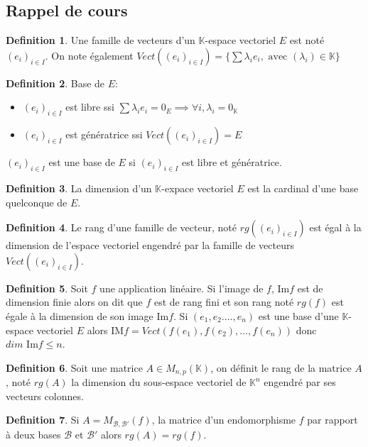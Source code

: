 \documentclass[]{book}
\theoremstyle{definition}
\newtheorem{defn}{Definition}
\newcommand{\bb}[1]{\mathbb{#1}}
\newcommand{\K}{\bb{K}}
\begin{document}
\subsection*{Rappel de cours}

\begin{defn}
Une famille de vecteurs d'un $\K$-espace vectoriel $E$ est not\'e $(e_i)_{i \in I}$. On note \'egalement $Vect((e_i)_{i \in I}) = \{\sum\lambda_i e_i, \text{ avec } (\lambda_i) \in \K\}$ 
\end{defn}

\begin{defn}
Base de $E$:
\begin{itemize}
\item $(e_i)_{i \in I}$ est libre ssi $\sum\lambda_i e_i = 0_E \implies \forall i, \lambda_i = 0_{\K}$
\item $(e_i)_{i \in I}$ est g\'en\'eratrice ssi $Vect((e_i)_{i \in I}) = E$
\end{itemize}
$(e_i)_{i \in I}$ est une base de $E$ si $(e_i)_{i \in I}$ est libre et g\'en\'eratrice.
\end{defn}

\begin{defn}
La dimension d'un $\K$-expace vectoriel $E$ est la cardinal d'une base quelconque de $E$. 
\end{defn}

\begin{defn}
Le rang d'une famille de vecteur, not\'e $rg((e_i)_{i \in I})$ est \'egal \`a la dimension de l'espace vectoriel engendr\'e par la famille de vecteurs $Vect((e_i)_{i \in I})$. 
\end{defn}

\begin{defn}
Soit $f$ une application lin\'eaire. Si l'image de $f$, $\text{Im} f$ est de dimension finie alors on dit que $f$ est de rang fini et son rang not\'e $rg(f)$ est \'egale \`a la dimension de son image $\text{Im} f$. Si $(e_1, e_2. \ldots, e_n)$ est une base d'une $\K$-espace vectoriel $E$ alors $\text{IM}f = Vect(f(e_1), f(e_2), \ldots, f(e_n))$ donc $dim \text{ Im}f \leq n$.
\end{defn}

\begin{defn}
Soit une matrice $A \in M_{n,p}(\K)$, on d\'efinit le rang de la matrice $A$, not\'e $rg(A)$ la dimension du sous-espace vectoriel de $\K^n$ engendr\'e par ses vecteurs colonnes. 
\end{defn}

\begin{defn}
Si $A = M_{\mathcal{B}, \mathcal{B'}}(f)$, la matrice d'un endomorphisme $f$ par rapport \`a deux bases $\mathcal{B}$ et $\mathcal{B'}$ alors $rg(A) = rg(f)$. 
\end{defn}
\end{document}
